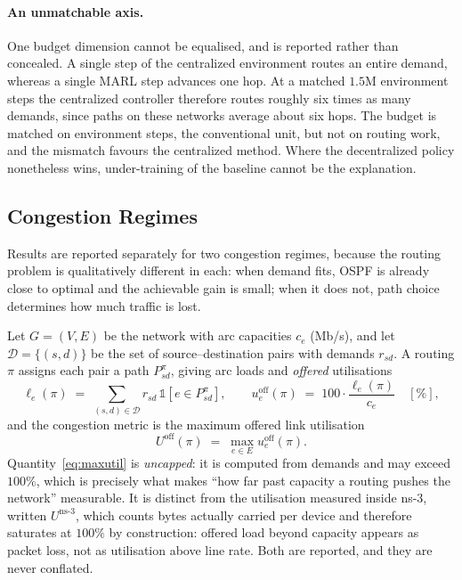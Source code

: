 \paragraph{An unmatchable axis.} One budget dimension cannot be equalised, and is
reported rather than concealed. A single step of the centralized environment
routes an entire demand, whereas a single MARL step advances one hop. At a matched
$1.5$M environment steps the centralized controller therefore routes roughly six
times as many demands, since paths on these networks average about six hops. The
budget is matched on environment steps, the conventional unit, but not on routing
work, and the mismatch favours the centralized method. Where the decentralized
policy nonetheless wins, under-training of the baseline cannot be the explanation.

\subsection{Congestion Regimes}
\label{sec:setup-regimes}

Results are reported separately for two congestion regimes, because the routing
problem is qualitatively different in each: when demand fits, OSPF is already
close to optimal and the achievable gain is small; when it does not, path choice
determines how much traffic is lost.

Let $G=(V,E)$ be the network with arc capacities $c_e$ (Mb/s), and let
$\mathcal{D}=\{(s,d)\}$ be the set of source--destination pairs with demands
$r_{sd}$. A routing $\pi$ assigns each pair a path $P^{\pi}_{sd}$, giving arc
loads and \emph{offered} utilisations
\begin{equation}
  \ell_e(\pi) \;=\; \sum_{(s,d)\in\mathcal{D}} r_{sd}\,
  \mathbb{1}\!\left[e \in P^{\pi}_{sd}\right],
  \qquad
  u^{\mathrm{off}}_e(\pi) \;=\; 100\cdot\frac{\ell_e(\pi)}{c_e}\quad[\%],
  \label{eq:util}
\end{equation}
and the congestion metric is the maximum offered link utilisation
\begin{equation}
  U^{\mathrm{off}}(\pi) \;=\; \max_{e\in E} u^{\mathrm{off}}_e(\pi).
  \label{eq:maxutil}
\end{equation}
Quantity~\eqref{eq:maxutil} is \emph{uncapped}: it is computed from demands and
may exceed $100\%$, which is precisely what makes ``how far past capacity a
routing pushes the network'' measurable. It is distinct from the utilisation
measured inside ns-3, written $U^{\mathrm{ns\text{-}3}}$, which counts bytes
actually carried per device and therefore saturates at $100\%$ by construction:
offered load beyond capacity appears as packet loss, not as utilisation above
line rate. Both are reported, and they are never conflated.

